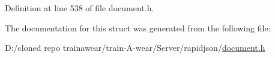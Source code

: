 Definition at line 538 of file document.\+h.


\begin{DoxyCode}{0}

\end{DoxyCode}


The documentation for this struct was generated from the following file\+:\begin{DoxyCompactItemize}
\item 
D\+:/cloned repo trainawear/train-\/\+A-\/wear/\+Server/rapidjson/\mbox{\hyperlink{document_8h}{document.\+h}}\end{DoxyCompactItemize}
